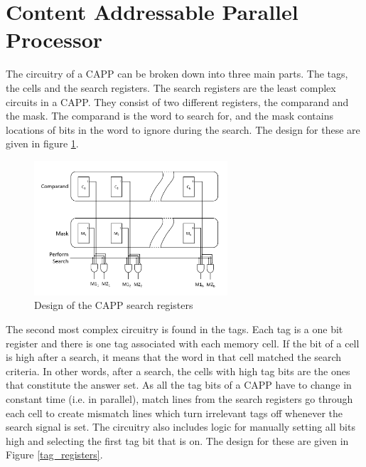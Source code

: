 \section{Content Addressable Parallel Processor}
The circuitry of a CAPP can be broken down into three main parts. The tags, the cells and the search registers. 
The search registers are the least complex circuits in a CAPP. They consist of two different registers, the comparand and the mask. The comparand is the word to search for, and the mask contains locations of bits in the word to ignore during the search. The design for these are given in figure \ref{search_circuit}.

\begin{figure}
  \includegraphics[height=5cm]{FPGA-CAPP research paper/images/search_registers.png}
  \caption{Design of the CAPP search registers}
  \label{search_circuit}
\end{figure}

The second most complex circuitry is found in the tags. Each tag is a one bit register and there is one tag associated with each memory cell. If the bit of a cell is high after a search, it means that the word in that cell matched the search criteria. In other words, after a search, the cells with high tag bits are the ones that constitute the answer set. As all the tag bits of a CAPP have to change in constant time (i.e. in parallel), match lines from the search registers go through each cell to create mismatch lines which turn irrelevant tags off whenever the search signal is set. The circuitry also includes logic for manually setting all bits high and selecting the first tag bit that is on. The design for these are given in Figure \ref{tag_registers}.

